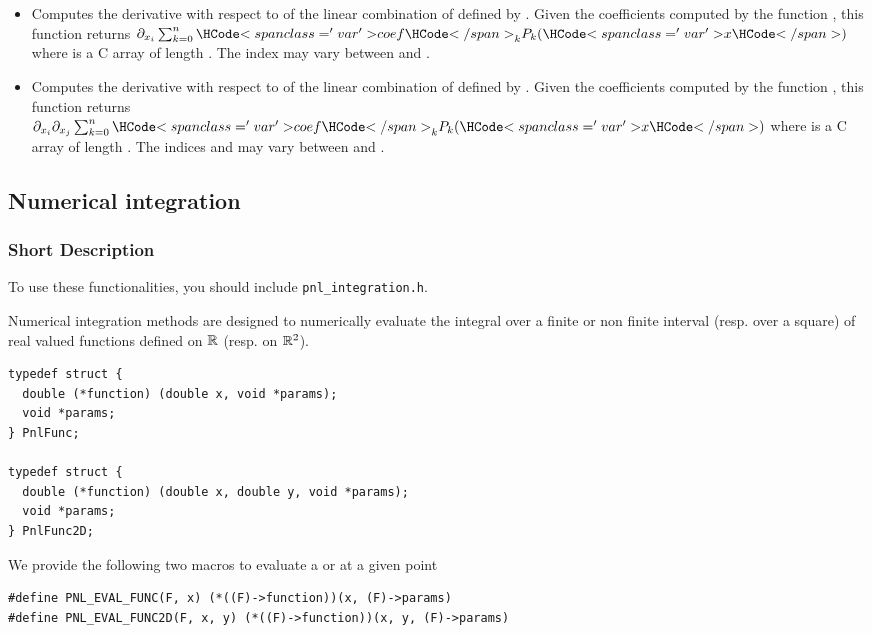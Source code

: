 \begin{itemize}
\item {}
  \sshortdescribe Computes the derivative with respect to  of the
  linear combination of  defined by . Given the
  coefficients computed by the function , this
  function returns $\partial_{x_i} \sum_{k=0}^n \var{coef}_k  P_k(\var{x})$
  where  is a C array of length . The index 
  may vary between  and .


\item {}
  \sshortdescribe Computes the derivative with respect to  of the
  linear combination of  defined by . Given the
  coefficients computed by the function , this
  function returns $\partial_{x_i} \partial_{x_j} \sum_{k=0}^n \var{coef}_k  P_k(\var{x})$
  where  is a C array of length . The indices 
  and  may vary between  and .
\end{itemize}


\subsection{Numerical integration}
\subsubsection{Short Description}

To use these functionalities, you should include \verb!pnl_integration.h!.

Numerical integration methods are designed to numerically evaluate the integral
over a finite or non finite interval (resp. over a square) of real valued
functions defined on ${\mathbb R}$ (resp. on ${\mathbb R}^2$).

\begin{verbatim}
typedef struct {
  double (*function) (double x, void *params);
  void *params;
} PnlFunc;

typedef struct {
  double (*function) (double x, double y, void *params);
  void *params;
} PnlFunc2D;
\end{verbatim}

We provide the following two macros to evaluate a  or
 at a given point
\begin{verbatim}
#define PNL_EVAL_FUNC(F, x) (*((F)->function))(x, (F)->params)
#define PNL_EVAL_FUNC2D(F, x, y) (*((F)->function))(x, y, (F)->params)
\end{verbatim}



